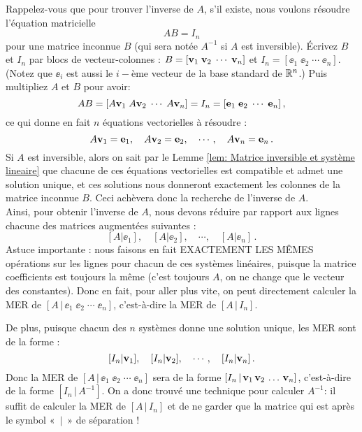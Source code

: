 Rappelez-vous que pour trouver l'inverse de $A$, s'il existe, nous voulons résoudre l'équation matricielle
$$
A B = I_n
$$
pour une matrice inconnue $B$ (qui sera notée $A^{-1}$ si $A$ est inversible).
\'Ecrivez $B$ et $I_n$ par blocs de vecteur-colonnes :
$B = [\mathbf{v}_1 \; \mathbf{v}_2 \; \cdots \; \mathbf{v}_n]$ et
$I_n = [\ee_1 \; \ee_2 \; \cdots \; \ee_n]$.  (Notez que  $\ee_i$ est
aussi le $i-$\`eme vecteur de la base standard de $\mathbb{R}^n$.)
Puis multipliez $A$ et $B$ pour avoir:
$$
AB = [A\mathbf{v}_1 \; A\mathbf{v}_2 \; \cdots \; A\mathbf{v}_n] = I_n = [\mathbf{e}_1 \; \mathbf{e}_2 \; \cdots \; \mathbf{e}_n]\,,
$$
ce qui donne en fait $n$ équations vectorielles à résoudre :
$$
A\mathbf{v}_1 = \mathbf{e}_1, \quad A\mathbf{v}_2 = \mathbf{e}_2, \quad\cdots, \quad A\mathbf{v}_n = \mathbf{e}_n\,.
$$
Si $A$ est inversible, alors on sait par le Lemme \ref{lem: Matrice inversible et système lineaire}  que chacune de ces équations vectorielles
est compatible et admet une solution unique, et ces
solutions nous donneront exactement les colonnes de la matrice inconnue $B$. Ceci achèvera donc la recherche de l'inverse de $A$.\\

Ainsi, pour obtenir l'inverse de $A$, nous devons réduire par rapport aux lignes chacune
des matrices augmentées suivantes :
$$
[A|\ee_1], \quad [A|\ee_2], \quad \cdots,\quad [A|\ee_n]\,.
$$
Astuce importante : nous faisons en fait EXACTEMENT LES MÊMES opérations sur les lignes
pour chacun de ces systèmes linéaires, puisque la matrice coefficients est toujours la même (c'est toujours $A$, on ne change que le vecteur des constantes). 
Donc en fait, pour aller plus vite, on peut directement calculer la MER de $[A\,|\,\ee_1\; \ee_2\; \cdots\; \ee_n]$, c'est-à-dire la MER de $[A\,|\,I_n]$.

De plus, puisque chacun des $n$ systèmes donne une solution unique, les MER sont de la forme :
$$
[I_n|\mathbf{v}_1],\quad [I_n|\mathbf{v}_2],\quad \cdots,\quad [I_n|\mathbf{v}_n]\,.
$$
Donc la MER de $[A\,|\,\ee_1\; \ee_2\; \cdots\; \ee_n]$ sera de la forme $[I_n \,|\,\mathbf{v}_1\, \mathbf{v}_2\, \dots\, \mathbf{v}_n]$, c'est-à-dire de la forme $[I_n\,|\,A^{-1}]$. On a donc trouvé une technique pour calculer $A^{-1}$: il suffit de calculer la MER de $[A\,|\,I_n]$ et de ne garder que la matrice qui est après le symbol «~$|$~» de séparation !

